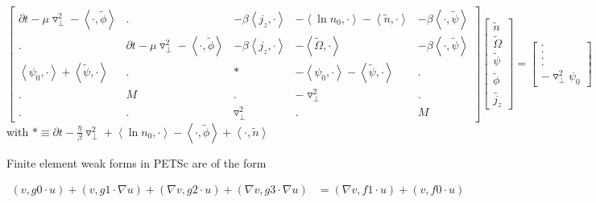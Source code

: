 \documentclass[10pt]{article}
\begin{document}
\begin{equation}
\begin{bmatrix}
  \partial t - \mu \triangledown_\perp^2  -\left \langle \cdot ,  \tilde{\phi} \right \rangle &  .&  -\beta \left \langle j_z, \cdot \right \rangle & -\left \langle \ln{n_0}, \cdot \right \rangle - \left \langle \tilde{n}, \cdot \right \rangle & -\beta \left \langle \cdot,  \tilde{\psi} \right \rangle \\ 
  
 . & \partial t -\mu \triangledown_\perp^2 -\left \langle \cdot, \tilde{\phi} \right \rangle &  -\beta \left \langle j_z, \cdot \right \rangle & -\left \langle \tilde{\Omega}, \cdot \right \rangle  & -\beta \left \langle \cdot,  \tilde{\psi} \right \rangle \\ 
 
\left \langle \psi_0, \cdot \right \rangle  + \left \langle \tilde{\psi}, \cdot \right \rangle & .  &  * & - \left \langle \psi_0, \cdot \right \rangle - \left \langle \tilde{\psi}, \cdot \right \rangle & .\\ 

 .& M & . &  -\triangledown_\perp^2 & .\\ 
 
 .& . &  \triangledown_\perp^2 & . & M
 
\end{bmatrix} \begin{bmatrix}
\tilde{n}\\
\tilde{\Omega} \\ 
\tilde{\psi} \\
\tilde{\phi} \\ 
\tilde{j_z}
\end{bmatrix} = \begin{bmatrix}
.\\ 
.\\ 
.\\ 
.\\ 
-\triangledown_\perp^2 \psi_0
\end{bmatrix}
\end{equation}
with $* \equiv \partial t - \frac{\eta}{\beta}\triangledown_\perp^2 + \left \langle \ln{n_0} , \cdot \right \rangle - \left \langle \cdot, \tilde{\phi} \right \rangle + \left \langle \cdot, \tilde{n} \right \rangle$

Finite element weak forms in PETSc are of the form

\begin{equation*}
  \begin{aligned}
   \left(  v,  g0 \cdot u \right)  +\left(  v,  g1 \cdot\nabla u \right) + \left(  \nabla v,  g2 \cdot u \right)  +\left(  \nabla v,  g3 \cdot\nabla u \right)   &=  \left( \nabla v, f1 \cdot u \right) + \left( v, f0 \cdot u \right) \\
  \end{aligned}
\end{equation*}
\end{document}
